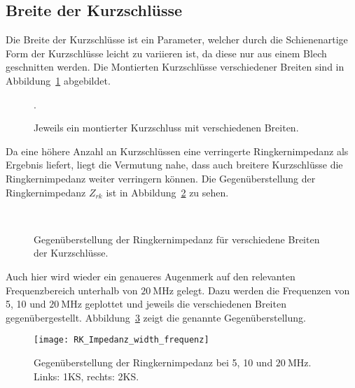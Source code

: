 \subsection{Breite der Kurzschl\"usse}
Die Breite der Kurzschl\"usse ist ein Parameter, welcher durch die Schienenartige Form der Kurzschl\"usse leicht zu variieren ist, da diese nur aus einem Blech geschnitten werden. Die Montierten Kurzschl\"usse verschiedener Breiten sind in Abbildung~\ref{fig:ringcorewidthCST} abgebildet.
\begin{figure}[htb]
	\centering.
	\hspace{0.02\textwidth}
	\hspace{0.02\textwidth}
	\caption{Jeweils ein montierter Kurzschluss mit verschiedenen Breiten.}
	\label{fig:ringcorewidthCST}
\end{figure}
\par
Da eine h\"ohere Anzahl an Kurzschl\"ussen eine verringerte Ringkernimpedanz als Ergebnis liefert, liegt die Vermutung nahe, dass auch breitere Kurzschl\"usse die Ringkernimpedanz weiter verringern k\"onnen. Die Gegen\"uberstellung der Ringkernimpedanz $Z_{rk}$ ist in Abbildung~\ref{fig:ringcorewidth} zu sehen.
\begin{figure}[htb]
	\centering
	\\
	\caption{Gegen\"uberstellung der Ringkernimpedanz f\"ur verschiedene Breiten der Kurzschl\"usse.}
	\label{fig:ringcorewidth}
\end{figure}
\par
Auch hier wird wieder ein genaueres Augenmerk auf den relevanten Frequenzbereich unterhalb von $\SI{20}{\mega\hertz}$ gelegt. Dazu werden die Frequenzen von 5, 10 und $\SI{20}{\mega\hertz}$ geplottet und jeweils die verschiedenen Breiten gegen\"ubergestellt. Abbildung~\ref{fig:ringcorewidth20} zeigt die genannte Gegen\"uberstellung.
\begin{figure}[htb]
	\centering
	\texttt{[image: RK\_Impedanz\_width\_frequenz]}
	\caption{Gegen\"uberstellung der Ringkernimpedanz bei 5, 10 und $\SI{20}{\mega\hertz}$. Links: 1KS, rechts: 2KS.}
	\label{fig:ringcorewidth20}
\end{figure}
